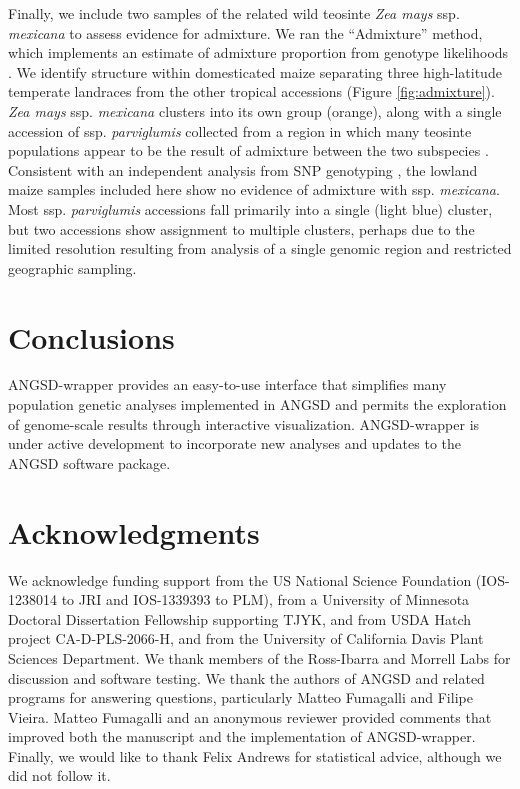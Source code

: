 \documentclass[10pt,a4paper]{article}
\begin{document}
Finally, we include two samples of the related wild teosinte \textit{Zea mays} ssp. \textit{mexicana} to assess evidence for admixture.  
We ran the ``Admixture'' method, which implements an estimate of admixture proportion from genotype likelihoods \citep{pmid24026093}.
We identify structure within domesticated maize separating three high-latitude temperate landraces from the other tropical accessions (Figure \ref{fig:admixture}). 
\textit{Zea mays} ssp. \textit{mexicana} clusters into its own group (orange), along with a single accession of ssp. \textit{parviglumis} collected from a region in which many teosinte populations appear to be the result of admixture between the two subspecies \citep{fang2012megabase}.  
Consistent with an independent analysis from SNP genotyping \citep{hufford2013genomic}, the lowland maize samples included here show no evidence of admixture with ssp. \textit{mexicana}.
Most ssp. \textit{parviglumis} accessions fall primarily into a single (light blue) cluster, but two accessions show assignment to multiple clusters, perhaps due to the limited resolution resulting from analysis of a single genomic region and restricted geographic sampling.

\section*{Conclusions}
ANGSD-wrapper provides an easy-to-use interface that simplifies many population genetic analyses implemented in ANGSD \citep{korneliussen2014angsd} and permits the exploration of genome-scale results through interactive visualization.
ANGSD-wrapper is under active development to incorporate new analyses and updates to the ANGSD software package.  

\section*{Acknowledgments}
We acknowledge funding support from the US National Science Foundation (IOS-1238014 to JRI and IOS-1339393 to PLM), from a University of Minnesota Doctoral Dissertation Fellowship supporting TJYK, and from USDA Hatch project CA-D-PLS-2066-H, and from the University of California Davis Plant Sciences Department.  We thank members of the Ross-Ibarra and Morrell Labs for discussion and software testing. We thank the authors of ANGSD and related programs for answering questions, particularly Matteo Fumagalli and Filipe Vieira. Matteo Fumagalli and an anonymous reviewer provided comments that improved both the manuscript and the implementation of ANGSD-wrapper. Finally, we would like to thank Felix Andrews for statistical advice, although we did not follow it. 
\clearpage
\singlespacing




\end{document}
